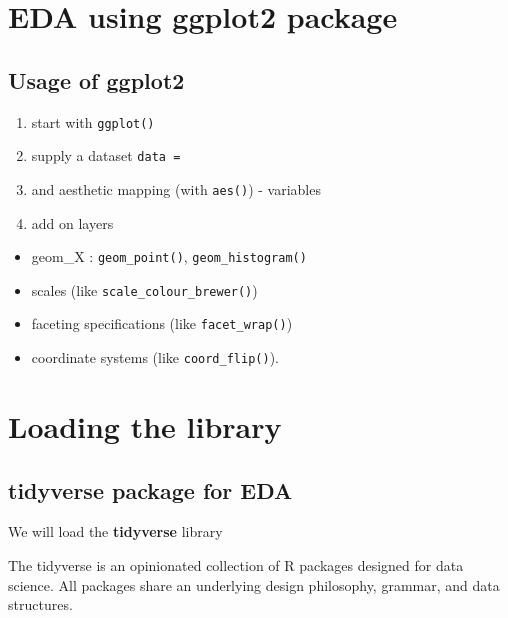 \documentclass[
]{book}
\providecommand{\tightlist}{%
  \setlength{\itemsep}{0pt}\setlength{\parskip}{0pt}}
\begin{document}
\hypertarget{eda-using-ggplot2-package}{%
\section{EDA using ggplot2 package}\label{eda-using-ggplot2-package}}

\hypertarget{usage-of-ggplot2}{%
\subsection{\texorpdfstring{Usage of \textbf{ggplot2}}{Usage of ggplot2}}\label{usage-of-ggplot2}}

\begin{enumerate}
\def\labelenumi{\arabic{enumi}.}
\tightlist
\item
  start with \texttt{ggplot()}
\item
  supply a dataset \texttt{data\ =}
\item
  and aesthetic mapping (with \texttt{aes()}) - variables
\item
  add on layers
\end{enumerate}

\begin{itemize}
\tightlist
\item
  geom\_X : \texttt{geom\_point()}, \texttt{geom\_histogram()}
\item
  scales (like \texttt{scale\_colour\_brewer()})
\item
  faceting specifications (like \texttt{facet\_wrap()})
\item
  coordinate systems (like \texttt{coord\_flip()}).
\end{itemize}

\hypertarget{loading-the-library}{%
\section{Loading the library}\label{loading-the-library}}

\hypertarget{tidyverse-package-for-eda}{%
\subsection{\texorpdfstring{\textbf{tidyverse} package for EDA}{tidyverse package for EDA}}\label{tidyverse-package-for-eda}}

We will load the \textbf{tidyverse} library

The tidyverse is an opinionated collection of R packages designed for data science. All packages share an underlying design philosophy, grammar, and data structures.
\end{document}
